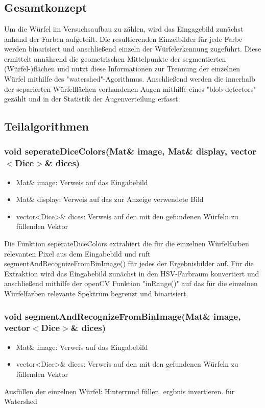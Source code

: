 \documentclass{../Vorlage/sebDenCls}
\begin{document}

\section{}
\subsection{Gesamtkonzept}
Um die Würfel im Versuchsaufbau zu zählen, wird das Eingagebild zunächst anhand der Farben aufgeteilt. Die resultierenden Einzelbilder für jede Farbe werden binarisiert und anschließend einzeln der Würfelerkennung zugeführt. Diese ermittelt annährend die geometrischen Mittelpunkte der segmentierten (Würfel-)flächen und nutzt diese Informationen zur Trennung der einzelnen Würfel mithilfe des "watershed"-Agorithmus. Anschließend werden die innerhalb der separierten Würfelflächen vorhandenen Augen mithilfe eines "blob detectors" gezählt und in der Statistik der Augenverteilung erfasst.


\subsection{Teilalgorithmen}
\subsubsection{void seperateDiceColors(Mat\& image, Mat\& display, vector $<$Dice$>$\& dices)}
\begin{itemize}
	\item Mat\& image: Verweis auf das Eingabebild
	\item Mat\& display: Verweis auf das zur Anzeige verwendete Bild 
	\item vector<Dice>\& dices: Verweis auf den mit den gefundenen Würfeln zu füllenden Vektor
\end{itemize}
Die Funktion seperateDiceColors extrahiert die für die einzelnen Würfelfarben relevanten Pixel aus dem Eingabebild und ruft segmentAndRecognizeFromBinImage() für jedes der Ergebnisbilder auf.
Für die Extraktion wird das Eingabebild zunächst in den HSV-Farbraum konvertiert und anschließend mithilfe der openCV Funktion "inRange()" auf das für die einzelnen Würfelfarben relevante Spektrum begrenzt und binarisiert. 

\subsubsection{void segmentAndRecognizeFromBinImage(Mat\& image, vector$<$Dice$>$\& dices)}
\begin{itemize}
	\item Mat\& image: Verweis auf das Eingabebild
	\item vector<Dice>\& dices: Verweis auf den mit den gefundenen Würfeln zu füllenden Vektor
\end{itemize}
Ausfüllen der einzelnen Würfel: Hinterrund füllen, ergbnis invertieren. für Watershed
\end{document}
